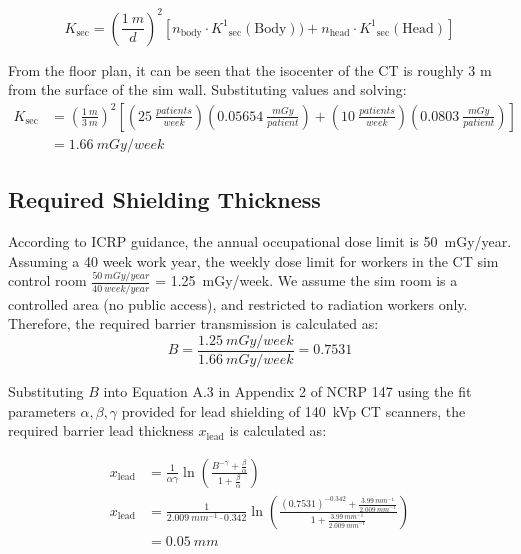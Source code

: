 \documentclass[%
aps,
mph,%
amsmath,amssymb,
preprint,%
tightenlines,
longbibliography,
superscriptaddress,
floatfix,
nofootinbib,
]{revtex4-2}
\begin{document}
        \begin{equation}\label{k_total}
            K\mathrm{_{sec}} = \left(\frac{\qty{1}{m}}{d}\right)^2 [n\mathrm{_{body}}\cdot K^1\mathrm{_{sec}(Body)}) + n\mathrm{_{head}}\cdot K^1\mathrm{_{sec}(Head)}]
        \end{equation}
        
        From the floor plan, it can be seen that the isocenter of the CT is roughly 3 m from the surface of the sim wall. Substituting values and solving: 
        \begin{align*}
            K\mathrm{_{sec}} &= \left(\frac{\qty{1}{m}}{\qty{3}{m}}\right)^2\left[\left(\qty{25}{\frac{patients}{week}}\right)\left(\SI{0.05654}{\frac{mGy}{patient}}\right)+ \left(\qty{10}{\frac{patients}{week}}\right)\left(\SI{0.0803}{\frac{mGy}{patient}}\right)\right]\\
            &= \SI{1.66}{mGy/week}
        \end{align*}
        
    \subsection{Required Shielding Thickness}
            According to ICRP guidance, the annual occupational dose limit is \qty{50}{mGy/year}. Assuming a 40 week work year, the weekly dose limit for workers in the CT sim control room $\frac{\qty{50}{mGy/year}}{\qty{40}{week/year}}$ = \qty{1.25}{mGy/week}. We assume the sim room is a controlled area (no public access), and restricted to radiation workers only. Therefore, the required barrier transmission is calculated as:
        \begin{equation*}
            B = \frac{\qty{1.25}{mGy/week}}{\qty{1.66}{mGy/week}} = 0.7531
        \end{equation*}
        
        Substituting $B$ into Equation A.3 in Appendix 2 of NCRP 147 using the fit parameters $\alpha, \beta, \gamma$ provided for lead shielding of \qty{140}{kVp} CT scanners, the required barrier lead thickness $x\mathrm{_{lead}}$ is calculated as:
        
        \begin{align*}
            x\mathrm{_{lead}} &= \frac{1}{\alpha\gamma}\ln\left(\frac{B^{-\gamma}+\frac{\beta}{\alpha}}{1+ \frac{\beta}{\alpha}} \right)\\
            x\mathrm{_{lead}} &= \frac{1}{\qty{2.009}{mm^{-1}}\cdot0.342}\ln\left(\frac{( 0.7531)^{-0.342}+\frac{\qty{3.99}{mm^{-1}}}{\qty{2.009}{mm^{-1}}}}{1+ \frac{\qty{3.99}{mm^{-1}}}{\qty{2.009}{mm^{-1}}}} \right)\\
            &= \qty{0.05}{mm}
        \end{align*}
        
\end{document}

